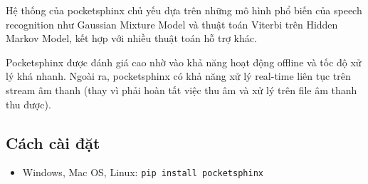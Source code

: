 Hệ thống của pocketsphinx chủ yếu dựa trên những mô hình phổ biến của speech recognition như Gaussian Mixture Model và thuật toán Viterbi trên Hidden Markov Model, kết hợp với nhiều thuật toán hỗ trợ khác\cite{huggins2006pocketsphinx}.

Pocketsphinx được đánh giá cao nhờ vào khả năng hoạt động offline và tốc độ xử lý khá nhanh. Ngoài ra, pocketsphinx có khả năng xử lý real-time liên tục trên stream âm thanh (thay vì phải hoàn tất việc thu âm và xử lý trên file âm thanh thu được).

\subsection{Cách cài đặt}
\begin{itemize}
\item Windows, Mac OS, Linux: \lstinline[language=bash]{pip install pocketsphinx}
\end{itemize}
